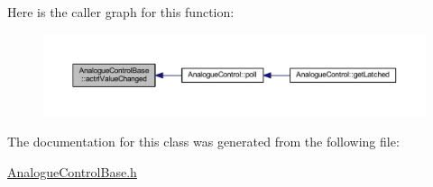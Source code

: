 Here is the caller graph for this function\+:
\nopagebreak
\begin{figure}[H]
\begin{center}
\leavevmode
\includegraphics[width=350pt]{d0/d4e/class_analogue_control_base_a9d18c3e299a69c909a3ad88b70524c5d_icgraph}
\end{center}
\end{figure}


The documentation for this class was generated from the following file\+:\begin{DoxyCompactItemize}
\item 
\hyperlink{_analogue_control_base_8h}{Analogue\+Control\+Base.\+h}\end{DoxyCompactItemize}
